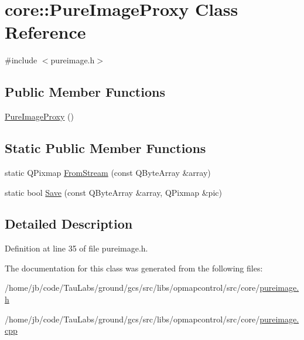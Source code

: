 \hypertarget{classcore_1_1_pure_image_proxy}{\section{core\-:\-:\-Pure\-Image\-Proxy \-Class \-Reference}
\label{classcore_1_1_pure_image_proxy}
}


{\ttfamily \#include $<$pureimage.\-h$>$}

\subsection*{\-Public \-Member \-Functions}
\begin{DoxyCompactItemize}
\item 
\hyperlink{group___o_p_map_widget_ga6c0425d3ca7f1f64fcfa477e419df111}{\-Pure\-Image\-Proxy} ()
\end{DoxyCompactItemize}
\subsection*{\-Static \-Public \-Member \-Functions}
\begin{DoxyCompactItemize}
\item 
static \-Q\-Pixmap \hyperlink{group___o_p_map_widget_gaadda67144242dbc72eecd8bf5e4ad935}{\-From\-Stream} (const \-Q\-Byte\-Array \&array)
\item 
static bool \hyperlink{group___o_p_map_widget_ga90956060e74b0bed45a12b6b99995c82}{\-Save} (const \-Q\-Byte\-Array \&array, \-Q\-Pixmap \&pic)
\end{DoxyCompactItemize}


\subsection{\-Detailed \-Description}


\-Definition at line 35 of file pureimage.\-h.



\-The documentation for this class was generated from the following files\-:\begin{DoxyCompactItemize}
\item 
/home/jb/code/\-Tau\-Labs/ground/gcs/src/libs/opmapcontrol/src/core/\hyperlink{pureimage_8h}{pureimage.\-h}\item 
/home/jb/code/\-Tau\-Labs/ground/gcs/src/libs/opmapcontrol/src/core/\hyperlink{pureimage_8cpp}{pureimage.\-cpp}\end{DoxyCompactItemize}
